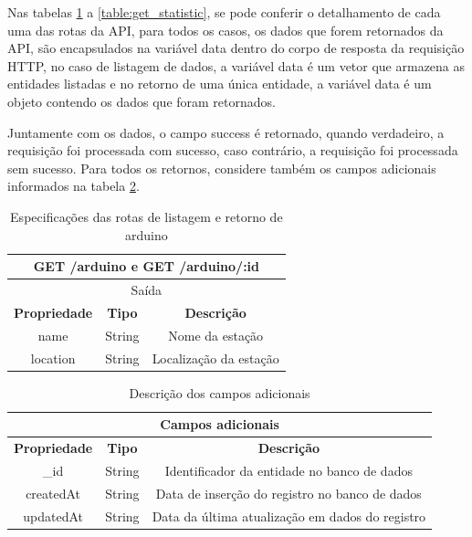 Nas tabelas \ref{table:get_arduino} a \ref{table:get_statistic}, se pode conferir o detalhamento de cada uma das rotas da API, para todos os casos, os dados que forem retornados da API, são encapsulados na variável data dentro do corpo de resposta da requisição HTTP, no caso de listagem de dados, a variável data é um vetor que armazena as entidades listadas e no retorno de uma única entidade, a variável data é um objeto contendo os dados que foram retornados.

Juntamente com os dados, o campo success é retornado, quando verdadeiro, a requisição foi processada com sucesso, caso contrário, a requisição foi processada sem sucesso. Para todos os retornos, considere também os campos adicionais informados na tabela \ref{table:campos_adicionais}.

\begin{table}[H]
    \centering
    \caption{Especificações das rotas de listagem e retorno de arduino \label{table:get_arduino}}
    \begin{tabular}{c|c|c}
    \hline
    \multicolumn{3}{c}{\textbf{GET /arduino e GET /arduino/:id}} \\ \hline
    \multicolumn{3}{c}{Saída}                                                          \\ \hline
    \textbf{Propriedade}         & \textbf{Tipo}         & \textbf{Descrição}            \\  \hline
    name                         & String                & Nome da estação               \\  \hline
    location                     & String                & Localização da estação \\

    \hline
    \end{tabular}
\end{table}

\begin{table}[H]
    \centering
    \caption{Descrição dos campos adicionais \label{table:campos_adicionais}}
    \begin{tabular}{c|c|c}
    \hline
    \multicolumn{3}{c}{\textbf{Campos adicionais}} \\ \hline
    \textbf{Propriedade}         & \textbf{Tipo}         & \textbf{Descrição}            \\  \hline
    \_id                         & String                & Identificador da entidade no banco de dados      \\  \hline
    createdAt                    & String                & Data de inserção do registro no banco de dados         \\ \hline
    updatedAt                    & String                & Data da última atualização em dados do registro         \\ \hline
    \end{tabular}
\end{table}

